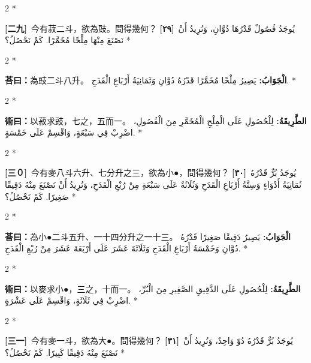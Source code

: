 \documentclass[11pt,a4paper]{article}
\newcommand{\ar}[1]{\arabicfont\beginR #1\endR}
\newcommand{\problemnum}[1]{\textbf{[\ignorespaces#1\unskip]}}
\newenvironment{bilingual}{%
  \begin{paracol}{2}%
  \switchcolumn[0]*%
}{%
  \end{paracol}%
}
\newcommand{\cnline}[1]{\switchcolumn[0]\noindent #1 \switchcolumn[1]}
\newcommand{\arline}[1]{\noindent\ar{#1} \switchcolumn[0]*}
\newenvironment{prob bilingual}{%
  \begin{paracol}{2}%
  \switchcolumn[0]*%
}{%
  \end{paracol}%
  \vspace{0.3em}%
}
\begin{document}
\begin{bilingual}
\cnline{\problemnum{二九}\, 今有菽二斗，欲為豉。問得幾何？}
\arline{\problemnum{٢٩}\, يُوجَدُ فُصُولٌ قَدْرُهَا دُوَّانِ، وَنُرِيدُ أَنْ نَصْنَعَ مِنْهَا مِلْحًا مُخَمَّرًا. كَمْ نَحْصُلُ؟}
\end{bilingual}

\begin{bilingual}
\cnline{\textcolor{answercolor}{\textbf{荅曰：}}為豉二斗八升。}
\arline{\textcolor{answercolor}{\textbf{الْجَوَابُ:}} يَصِيرُ مِلْحًا مُخَمَّرًا قَدْرُهُ دُوَّانِ وَثَمَانِيَةُ أَرْبَاعِ الْقَدَحِ.}
\end{bilingual}

\begin{bilingual}
\cnline{%
\textcolor{methodcolor}{\textbf{術曰：}}以菽求豉，七之，五而一。
}
\arline{%
\textcolor{methodcolor}{\textbf{الطَّرِيقَةُ:}} لِلْحُصُولِ عَلَى الْمِلْحِ الْمُخَمَّرِ مِنَ الْفُصُولِ، اضْرِبْ فِي سَبْعَةٍ، وَاقْسِمْ عَلَى خَمْسَةٍ.
}
\end{bilingual}

\begin{bilingual}
\cnline{\problemnum{三０}\, 今有麥八斗六升、七分升之三，欲為小●，問得幾何？}
\arline{\problemnum{٣٠}\, يُوجَدُ بُرٌّ قَدْرُهُ ثَمَانِيَةُ أَدْوَاءٍ وَسِتَّةُ أَرْبَاعِ الْقَدَحِ وَثَلَاثَةٌ عَلَى سَبْعَةٍ مِنْ رُبْعِ الْقَدَحِ، وَنُرِيدُ أَنْ نَصْنَعَ مِنْهُ دَقِيقًا صَغِيرًا. كَمْ نَحْصُلُ؟}
\end{bilingual}

\begin{bilingual}
\cnline{\textcolor{answercolor}{\textbf{荅曰：}}為小●二斗五升、一十四分升之一十三。}
\arline{\textcolor{answercolor}{\textbf{الْجَوَابُ:}} يَصِيرُ دَقِيقًا صَغِيرًا قَدْرُهُ دُوَّانِ وَخَمْسَةُ أَرْبَاعِ الْقَدَحِ وَثَلَاثَةَ عَشَرَ عَلَى أَرْبَعَةَ عَشَرَ مِنْ رُبْعِ الْقَدَحِ.}
\end{bilingual}

\begin{bilingual}
\cnline{%
\textcolor{methodcolor}{\textbf{術曰：}}以麥求小●，三之，十而一。
}
\arline{%
\textcolor{methodcolor}{\textbf{الطَّرِيقَةُ:}} لِلْحُصُولِ عَلَى الدَّقِيقِ الصَّغِيرِ مِنَ الْبُرِّ، اضْرِبْ فِي ثَلَاثَةٍ، وَاقْسِمْ عَلَى عَشْرَةٍ.
}
\end{bilingual}

\begin{bilingual}
\cnline{\problemnum{三一}\, 今有麥一斗，欲為大●。問得幾何？}
\arline{\problemnum{٣١}\, يُوجَدُ بُرٌّ قَدْرُهُ دُوّ وَاحِدٌ، وَنُرِيدُ أَنْ نَصْنَعَ مِنْهُ دَقِيقًا كَبِيرًا. كَمْ نَحْصُلُ؟}
\end{bilingual}
\end{document}
